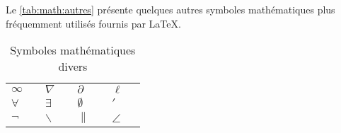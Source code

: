 Le \autoref{tab:math:autres} présente quelques autres symboles
mathématiques plus fréquemment utilisés fournis par {\LaTeX}.

\begin{table}[h]
  \caption{Symboles mathématiques divers}
  \label{tab:math:autres}
  \begin{tabularx}{1.0\linewidth}{lXlXlXlX}
    $\infty$ & \cmd{\infty} &
    $\nabla$ & \cmd{\nabla} &
    $\partial$ & \cmd{\partial} &
    $\ell$ & \cmd{\ell} \\
    $\forall$ & \cmd{\forall} &
    $\exists$ & \cmd{\exists} &
    $\emptyset$ & \cmd{\emptyset} &
    $\prime$ & \cmd{\prime} \\
    $\neg$ & \cmd{\neg} &
    $\backslash$ & \cmd{\backslash} &
    $\|$ & \cmd{\|} &
    $\angle$ & \cmd{\angle}
  \end{tabularx}
\end{table}


